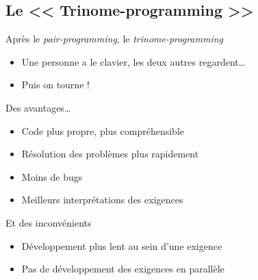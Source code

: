 	\subsection{Le << Trinome-programming >>}			%
	\begin{frame}{\large Après le \textit{pair-programming}, le \textit{trinome-programming}}
		\begin{itemize}
			\item Une personne a le clavier, les deux autres regardent…
			\item Puis on tourne !
		\end{itemize}
		\vfill
		\pause
		\begin{exampleblock}{Des avantages…}
			\begin{itemize}
				\item Code plus propre, plus compréhensible
				\item Résolution des problèmes plus rapidement
				\item Moins de bugs
				\item Meilleurs interprétations des exigences
			\end{itemize}
	\end{exampleblock}
		\pause
	\vfill
	\begin{alertblock}{Et des inconvénients}
	\begin{itemize}
		\item Développement plus lent au sein d'une exigence
		\item Pas de développement des exigences en parallèle
	\end{itemize}
	\end{alertblock}
	\end{frame}
	
